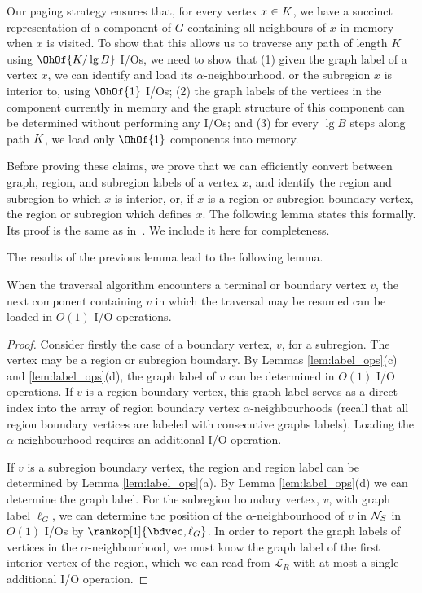 {Our paging strategy ensures that, for every vertex $x \in K$, we have
a succinct representation of a component of $G$ containing all
neighbours of $x$ in memory when $x$ is visited.
To show that this allows us to traverse any path of length $K$
using $\OhOf{K / \lg B}$ I/Os, we need to show that
(1) given the graph label of a vertex $x$, we can identify and load its
$\alpha$-neighbourhood, or the subregion $x$ is interior to, using $\OhOf{1}$
I/Os; (2) the graph labels of the vertices in the component currently
in memory and the graph structure of this component
can be determined without performing any I/Os; and (3) for every
$\lg B$ steps along path $K$, we load only $\OhOf{1}$ components into memory.

Before proving these claims, we prove that we can efficiently convert between
graph, region, and subregion labels of a vertex $x$, and identify the region and
subregion to which $x$ is interior, or, if $x$ is a region or subregion boundary vertex,
the region or subregion which defines $x$.
The following lemma states this formally.
Its proof is the same as in~\cite{DBLP:journals/talg/BoseCHMM12}.
We include it here for completeness.

The results of the previous lemma lead to the following lemma.

\begin{lemma}
\label{lem:component_ios}
When the traversal algorithm encounters a terminal or boundary
vertex $v$, the next component containing $v$ in which the traversal
may be resumed can be loaded in $O(1)$ I/O operations.
\end{lemma}

\begin{proof}
Consider firstly the case of a boundary vertex, $v$, for a subregion.
The vertex may be a region or subregion boundary.
By Lemmas \ref{lem:label_ops}(c) and \ref{lem:label_ops}(d), the graph
label of $v$ can be determined in $O(1)$ I/O operations.
If $v$ is a region boundary vertex, this graph label serves as a direct 
index into the array of region boundary vertex $\alpha$-neighbourhoods 
(recall that all region boundary vertices are labeled with consecutive 
graphs labels).
Loading the $\alpha$-neighbourhood requires an additional I/O operation.

If $v$ is a subregion boundary vertex, the region and region
label can be determined by Lemma \ref{lem:label_ops}(a). 
By Lemma \ref{lem:label_ops}(d) we can determine the graph label. 
For the subregion boundary vertex, $v$, with graph label $\ell_G$, we can
determine the position of the $\alpha$-neighbourhood of $v$ in
$\mathcal{N}_S$ in $O(1)$ I/Os by $\rankop[1]{\bdvec, \ell_G}$.
In order to report the graph labels of vertices in the
  $\alpha$-neighbourhood, we must know the graph label of the first
  interior vertex of the region, which we can read from
  $\mathcal{L}_R$ with at most a single additional I/O operation.


\end{proof}}
